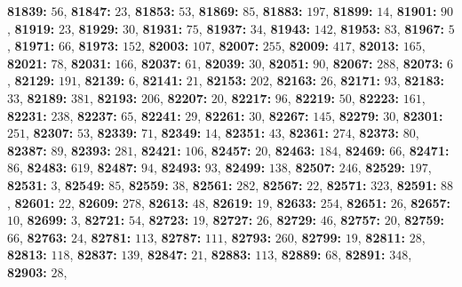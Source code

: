 \textsf{\bfseries 81839:} $56$, \textsf{\bfseries 81847:} $23$, \textsf{\bfseries 81853:} $53$, \textsf{\bfseries 81869:} $85$, \textsf{\bfseries 81883:} $197$, \textsf{\bfseries 81899:} $14$, \textsf{\bfseries 81901:} $90$, \textsf{\bfseries 81919:} $23$, \textsf{\bfseries 81929:} $30$, \textsf{\bfseries 81931:} $75$, \textsf{\bfseries 81937:} $34$, \textsf{\bfseries 81943:} $142$, \textsf{\bfseries 81953:} $83$, \textsf{\bfseries 81967:} $5$, \textsf{\bfseries 81971:} $66$, \textsf{\bfseries 81973:} $152$, \textsf{\bfseries 82003:} $107$, \textsf{\bfseries 82007:} $255$, \textsf{\bfseries 82009:} $417$, \textsf{\bfseries 82013:} $165$, \textsf{\bfseries 82021:} $78$, \textsf{\bfseries 82031:} $166$, \textsf{\bfseries 82037:} $61$, \textsf{\bfseries 82039:} $30$, \textsf{\bfseries 82051:} $90$, \textsf{\bfseries 82067:} $288$, \textsf{\bfseries 82073:} $6$, \textsf{\bfseries 82129:} $191$, \textsf{\bfseries 82139:} $6$, \textsf{\bfseries 82141:} $21$, \textsf{\bfseries 82153:} $202$, \textsf{\bfseries 82163:} $26$, \textsf{\bfseries 82171:} $93$, \textsf{\bfseries 82183:} $33$, \textsf{\bfseries 82189:} $381$, \textsf{\bfseries 82193:} $206$, \textsf{\bfseries 82207:} $20$, \textsf{\bfseries 82217:} $96$, \textsf{\bfseries 82219:} $50$, \textsf{\bfseries 82223:} $161$, \textsf{\bfseries 82231:} $238$, \textsf{\bfseries 82237:} $65$, \textsf{\bfseries 82241:} $29$, \textsf{\bfseries 82261:} $30$, \textsf{\bfseries 82267:} $145$, \textsf{\bfseries 82279:} $30$, \textsf{\bfseries 82301:} $251$, \textsf{\bfseries 82307:} $53$, \textsf{\bfseries 82339:} $71$, \textsf{\bfseries 82349:} $14$, \textsf{\bfseries 82351:} $43$, \textsf{\bfseries 82361:} $274$, \textsf{\bfseries 82373:} $80$, \textsf{\bfseries 82387:} $89$, \textsf{\bfseries 82393:} $281$, \textsf{\bfseries 82421:} $106$, \textsf{\bfseries 82457:} $20$, \textsf{\bfseries 82463:} $184$, \textsf{\bfseries 82469:} $66$, \textsf{\bfseries 82471:} $86$, \textsf{\bfseries 82483:} $619$, \textsf{\bfseries 82487:} $94$, \textsf{\bfseries 82493:} $93$, \textsf{\bfseries 82499:} $138$, \textsf{\bfseries 82507:} $246$, \textsf{\bfseries 82529:} $197$, \textsf{\bfseries 82531:} $3$, \textsf{\bfseries 82549:} $85$, \textsf{\bfseries 82559:} $38$, \textsf{\bfseries 82561:} $282$, \textsf{\bfseries 82567:} $22$, \textsf{\bfseries 82571:} $323$, \textsf{\bfseries 82591:} $88$, \textsf{\bfseries 82601:} $22$, \textsf{\bfseries 82609:} $278$, \textsf{\bfseries 82613:} $48$, \textsf{\bfseries 82619:} $19$, \textsf{\bfseries 82633:} $254$, \textsf{\bfseries 82651:} $26$, \textsf{\bfseries 82657:} $10$, \textsf{\bfseries 82699:} $3$, \textsf{\bfseries 82721:} $54$, \textsf{\bfseries 82723:} $19$, \textsf{\bfseries 82727:} $26$, \textsf{\bfseries 82729:} $46$, \textsf{\bfseries 82757:} $20$, \textsf{\bfseries 82759:} $66$, \textsf{\bfseries 82763:} $24$, \textsf{\bfseries 82781:} $113$, \textsf{\bfseries 82787:} $111$, \textsf{\bfseries 82793:} $260$, \textsf{\bfseries 82799:} $19$, \textsf{\bfseries 82811:} $28$, \textsf{\bfseries 82813:} $118$, \textsf{\bfseries 82837:} $139$, \textsf{\bfseries 82847:} $21$, \textsf{\bfseries 82883:} $113$, \textsf{\bfseries 82889:} $68$, \textsf{\bfseries 82891:} $348$, \textsf{\bfseries 82903:} $28$, 
